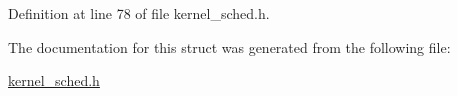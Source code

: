 Definition at line 78 of file kernel\-\_\-sched.\-h.



The documentation for this struct was generated from the following file\-:\begin{DoxyCompactItemize}
\item 
\hyperlink{kernel__sched_8h}{kernel\-\_\-sched.\-h}\end{DoxyCompactItemize}
